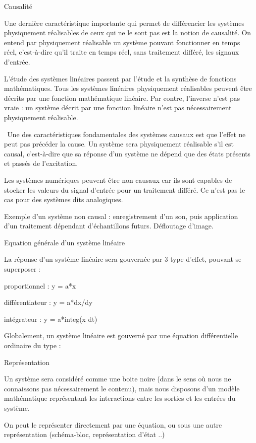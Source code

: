 \documentclass[]{article}
\begin{document}
Causalité

Une dernière caractéristique importante qui permet de différencier les
systèmes physiquement réalisables de ceux qui ne le sont pas est la
notion de causalité. On entend par physiquement réalisable un système
pouvant fonctionner en temps réel, c'est-à-dire qu'il traite en temps
réel, sans traitement différé, les signaux d'entrée.

L'étude des systèmes linéaires passent par l'étude et la synthèse de
fonctions mathématiques. Tous les systèmes linéaires physiquement
réalisables peuvent être décrits par une fonction mathématique linéaire.
Par contre, l'inverse n'est pas vraie : un système décrit par une
fonction linéaire n'est pas nécessairement physiquement réalisable.

~Une des caractéristiques fondamentales des systèmes causaux est que
l'effet ne peut pas précéder la cause. Un système sera physiquement
réalisable s'il est causal, c'est-à-dire que sa réponse d'un système ne
dépend que des états présents et passés de l'excitation.

Les systèmes numériques peuvent être non causaux car ils sont capables
de stocker les valeurs du signal d'entrée pour un traitement différé. Ce
n'est pas le cas pour des systèmes dits analogiques.

Exemple d'un système non causal : enregistrement d'un son, puis
application d'un traitement dépendant d'échantillons futurs. Défloutage
d'image.

Equation générale d'un système linéaire

La réponse d'un système linéaire sera gouvernée par 3 type d'effet,
pouvant se superposer :

proportionnel : y = a*x

différentiateur : y = a*dx/dy

intégrateur : y = a*integ(x dt)~

Globalement, un système linéaire est gouverné par une équation
différentielle ordinaire du type :~

Représentation~

Un système sera considéré comme une boite noire (dans le sens où nous ne
connaissons pas nécessairement le contenu), mais nous disposons d'un
modèle mathématique représentant les interactions entre les sorties et
les entrées du système.~

On peut le représenter directement par une équation, ou sous une autre
représentation (schéma-bloc, représentation d'état ..)
\end{document}
